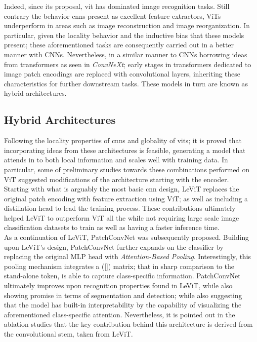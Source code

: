 \noindent Indeed, since its proposal, \gls{vit} has dominated image recognition tasks. Still 
contrary the behavior \glspl{cnn} present as excellent feature extractors, ViTs underperform in 
areas such as image reconstruction and image reorganization. In particular, given the locality 
behavior and the inductive bias that these models present; these aforementioned tasks are 
consequently carried out in a better manner with CNNs. Nevertheless, in a similar manner to 
CNNs borrowing ideas from transformers as seen in \emph{ConvNeXt}; early stages in transformers 
dedicated to image patch encodings are replaced with convolutional layers, inheriting these 
characteristics for further downstream tasks. These models in turn are known as hybrid 
architectures.


\subsection{Hybrid Architectures}
\label{rel:sub_hybrid}
Following the locality properties of \glspl{cnn} and globality of \glspl{vit}; it is proved 
that incorporating ideas from these architectures is feasible, generating a model that attends in 
to both local information and scales well with training data. In particular, some of 
preliminary studies towards these combinations performed on ViT suggested modifications of the 
architecture starting with the encoder. Starting with what is arguably the most basic \gls{cnn} 
design, LeViT \autocite{graham2021levit} replaces the original patch encoding with feature 
extraction using ViT; as well as including a distillation head to lead the training process. 
These contributions ultimately helped LeViT to outperform ViT all the while not requiring large 
scale image classification datasets to train as well as having a faster inference time.\\

\noindent As a continuation of LeViT, PatchConvNet \autocite{touvron2021augmenting} was subsequently 
proposed. Building upon LeViT's design, PatchConvNet further expands on the classifier by 
replacing the original MLP head with \emph{Attention-Based Pooling}. Interestingly, this 
pooling mechanism integrates a ([]) matrix; that in sharp comparison to the stand-alone 
token, is able to capture class-specific information. PatchConvNet ultimately improves upon 
recognition properties found in LeViT, while also showing promise in terms of segmentation and 
detection; while also suggesting that the model has built-in interpretability by the capability of 
visualizing the aforementioned class-specific attention. Nevertheless, it is pointed out in the 
ablation studies that the key contribution behind this architecture is derived from the 
convolutional stem, taken from LeViT.\\ 

